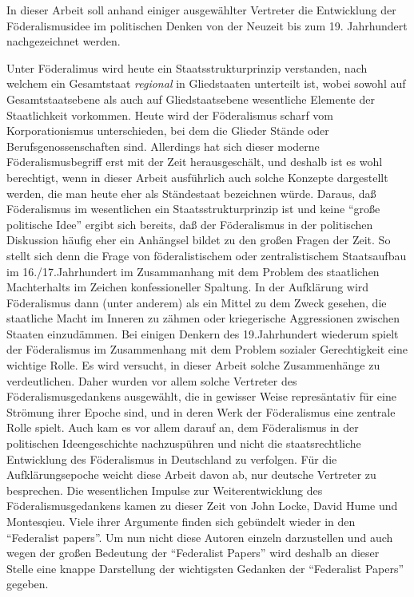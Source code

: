 \documentclass[a4paper,12pt]{article}
\begin{document}
In dieser Arbeit soll anhand einiger ausgewählter Vertreter die
Entwicklung der Föderalismusidee im politischen Denken von der
Neuzeit bis zum 19. Jahrhundert nachgezeichnet werden.

Unter Föderalimus wird heute ein Staatsstrukturprinzip verstanden,
nach welchem ein Gesamtstaat {\em regional} in Gliedstaaten
unterteilt ist, wobei sowohl auf Gesamtstaatsebene als auch auf
Gliedstaatsebene wesentliche Elemente der Staatlichkeit
vorkommen. Heute wird der Föderalismus scharf vom Korporationismus
unterschieden, bei dem die Glieder Stände oder
Berufsgenossenschaften sind. Allerdings hat sich dieser moderne
Föderalismusbegriff erst mit der Zeit herausgeschält, und deshalb
ist es wohl berechtigt, wenn in dieser Arbeit ausführlich auch
solche Konzepte dargestellt werden, die man heute eher als
Ständestaat bezeichnen würde. Daraus, daß Föderalismus im
wesentlichen ein Staatsstrukturprinzip ist und keine "`große
politische Idee"' ergibt sich bereits, daß der Föderalismus in der
politischen Diskussion häufig eher ein Anhängsel bildet zu den
großen Fragen der Zeit. So stellt sich denn die Frage von
föderalistischem oder zentralistischem Staatsaufbau im
16./17.Jahrhundert im Zusammanhang mit dem Problem des staatlichen
Machterhalts im Zeichen konfessioneller Spaltung. In der Aufklärung
wird Föderalismus dann (unter anderem) als ein Mittel zu dem Zweck
gesehen, die staatliche Macht im Inneren zu zähmen oder
kriegerische Aggressionen zwischen Staaten einzudämmen. Bei einigen
Denkern des 19.Jahrhundert wiederum spielt der Föderalismus im
Zusammenhang mit dem Problem sozialer Gerechtigkeit eine wichtige
Rolle. Es wird versucht, in dieser Arbeit solche Zusammenhänge zu
verdeutlichen. Daher wurden vor allem solche Vertreter
des Föderalismusgedankens ausgewählt, die in gewisser Weise
represäntativ für eine Strömung ihrer Epoche sind, und in deren
Werk der Föderalismus eine zentrale Rolle spielt. Auch kam es vor
allem darauf an, dem Föderalismus in der politischen
Ideengeschichte nachzuspühren und nicht die staatsrechtliche
Entwicklung des Föderalismus in Deutschland zu verfolgen. Für die
Aufklärungsepoche weicht diese Arbeit davon ab, nur deutsche
Vertreter zu besprechen. Die wesentlichen Impulse zur
Weiterentwicklung des Föderalismusgedankens kamen zu dieser Zeit
von John Locke, David Hume und Montesqieu. Viele ihrer Argumente
finden sich gebündelt wieder in den "`Federalist papers"'. Um nun
nicht diese Autoren einzeln darzustellen und auch wegen der großen
Bedeutung der "`Federalist Papers"' wird deshalb an dieser Stelle
eine knappe Darstellung der wichtigsten Gedanken der "`Federalist
Papers"' gegeben.
\end{document}

